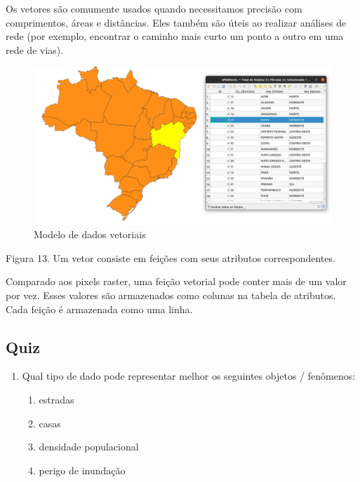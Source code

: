 \documentclass[
  portuguese,
]{krantz}
\providecommand{\tightlist}{%
  \setlength{\itemsep}{0pt}\setlength{\parskip}{0pt}}
\begin{document}
Os vetores são comumente usados quando necessitamos precisão com comprimentos, áreas e distâncias. Eles também são úteis ao realizar análises de rede (por exemplo, encontrar o caminho mais curto um ponto a outro em uma rede de vias).

\begin{figure}
\centering
\includegraphics{media/modulo0/vector.png}
\caption{Modelo de dados vetoriais}
\end{figure}

Figura 13. Um vetor consiste em feições com seus atributos correspondentes.

Comparado aos pixels raster, uma feição vetorial pode conter mais de um valor por vez. Esses valores são armazenados como colunas na tabela de atributos. Cada feição é armazenada como uma linha.

\hypertarget{quiz-1}{%
\subsection{Quiz}\label{quiz-1}}

\begin{enumerate}
\def\labelenumi{\arabic{enumi}.}
\tightlist
\item
  Qual tipo de dado pode representar melhor os seguintes objetos / fenômenos:

  \begin{enumerate}
  \def\labelenumii{\arabic{enumii}.}
  \tightlist
  \item
    estradas
  \item
    casas
  \item
    densidade populacional
  \item
    perigo de inundação
  \end{enumerate}
\end{enumerate}
\end{document}

